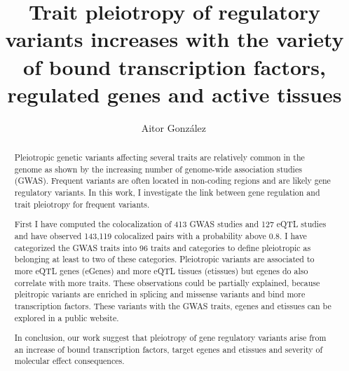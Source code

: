 
\title{Trait pleiotropy of regulatory variants increases with the variety of bound transcription factors, regulated genes and active tissues}

\author[1,*]{Aitor González\,}

\date{}

\maketitle

\begin{abstract}

Pleiotropic genetic variants affecting several traits are relatively common in the genome as shown by the increasing number of genome-wide association studies (GWAS).
%
Frequent variants are often located in non-coding regions and are likely gene regulatory variants.
%
In this work, I investigate the link between gene regulation and trait pleiotropy for frequent variants.

First I have computed the colocalization of 413 GWAS studies and 127 eQTL studies and have observed 143,119 colocalized pairs with a probability above 0.8.
%
I have categorized the GWAS traits into 96 traits and categories to define pleiotropic as belonging at least to two of these categories.
%
Pleiotropic variants are associated to more eQTL genes (eGenes) and more eQTL tissues (etissues) but egenes do also correlate with more traits.
%
These observations could be partially explained, because pleitropic variants are enriched in splicing and missense variants and bind more transcription factors.
%
These variants with the GWAS traits, egenes and etissues can be explored in a public website.

In conclusion, our work suggest that pleiotropy of gene regulatory variants arise from an increase of bound transcription factors, target egenes and etissues and severity of molecular effect consequences.

\end{abstract}



